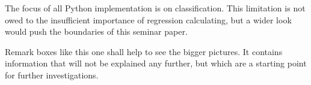 The focus of all Python implementation is on classification. This limitation is not owed to the insufficient importance of regression calculating, but a wider look would push the boundaries of this seminar paper.   

\begin{remark}
    Remark boxes like this one shall help to see the bigger pictures. It contains information that will not be explained any further, but which are a starting point for further investigations.
\end{remark}




\newpage
